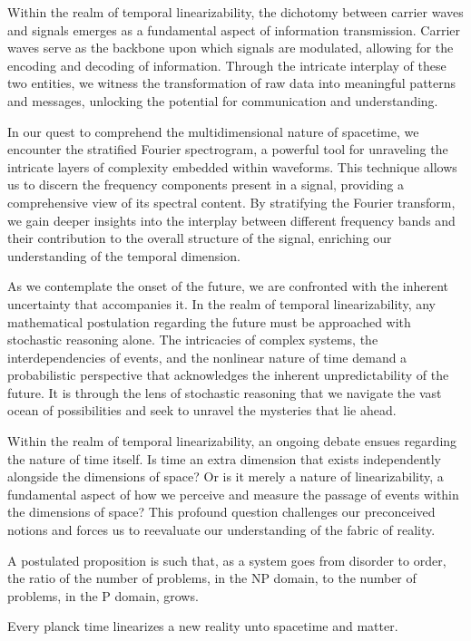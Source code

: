 \documentclass[ebook,12pt,oneside,openany]{memoir}
\begin{document}
\indent Within the realm of temporal linearizability, the dichotomy between carrier waves and signals emerges as a fundamental aspect of information transmission. Carrier waves serve as the backbone upon which signals are modulated, allowing for the encoding and decoding of information. Through the intricate interplay of these two entities, we witness the transformation of raw data into meaningful patterns and messages, unlocking the potential for communication and understanding.

\indent In our quest to comprehend the multidimensional nature of spacetime, we encounter the stratified Fourier spectrogram, a powerful tool for unraveling the intricate layers of complexity embedded within waveforms. This technique allows us to discern the frequency components present in a signal, providing a comprehensive view of its spectral content. By stratifying the Fourier transform, we gain deeper insights into the interplay between different frequency bands and their contribution to the overall structure of the signal, enriching our understanding of the temporal dimension.

\indent As we contemplate the onset of the future, we are confronted with the inherent uncertainty that accompanies it. In the realm of temporal linearizability, any mathematical postulation regarding the future must be approached with stochastic reasoning alone. The intricacies of complex systems, the interdependencies of events, and the nonlinear nature of time demand a probabilistic perspective that acknowledges the inherent unpredictability of the future. It is through the lens of stochastic reasoning that we navigate the vast ocean of possibilities and seek to unravel the mysteries that lie ahead.

\indent Within the realm of temporal linearizability, an ongoing debate ensues regarding the nature of time itself. Is time an extra dimension that exists independently alongside the dimensions of space? Or is it merely a nature of linearizability, a fundamental aspect of how we perceive and measure the passage of events within the dimensions of space? This profound question challenges our preconceived notions and forces us to reevaluate our understanding of the fabric of reality.

\indent A postulated proposition is such that, as a system goes from disorder to order, the ratio of the number of problems, in the NP domain, to the number of problems, in the P domain, grows.

\indent Every planck time linearizes a new reality unto spacetime and matter.
\end{document}
